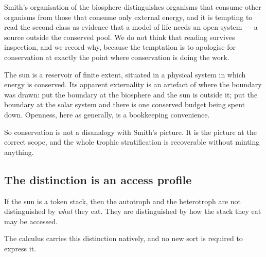 Smith's organisation of the biosphere \cite{SmithMorowitz} distinguishes organisms that consume other
organisms from those that consume only external energy, and it is tempting to read the second class as
evidence that a model of life needs an open system --- a source outside the conserved pool. We do not
think that reading survives inspection, and we record why, because the temptation is to apologise for
conservation at exactly the point where conservation is doing the work.

The sun is a reservoir of finite extent, situated in a physical system in which energy is conserved.
Its apparent externality is an artefact of where the boundary was drawn: put the boundary at the
biosphere and the sun is outside it; put the boundary at the solar system and there is one conserved
budget being spent down. Openness, here as generally, is a bookkeeping convenience.

So conservation is not a disanalogy with Smith's picture. It is the picture at the correct scope, and
the whole trophic stratification is recoverable without minting anything.

\subsection{The distinction is an access profile}\label{sci:S11.2}

If the sun is a token stack, then the autotroph and the heterotroph are not distinguished by
\emph{what} they eat. They are distinguished by how the stack they eat may be accessed.

\begin{table}[h]
\centering
{}
\caption{The trophic distinction is an access profile, not a kind of substance.}
\label{sci:tab:trophic}
\end{table}

The calculus carries this distinction natively, and no new sort is required to express it.

